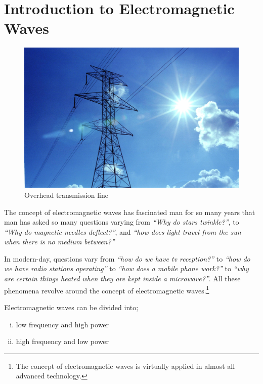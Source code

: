 \chapter{Introduction to Electromagnetic Waves}\label{lec:lec1}

\begin{figure}[h]
\centering
\includegraphics[width=1\linewidth]{./graphics/transmission1}
\caption{Overhead transmission line}
\end{figure}

The concept of electromagnetic waves has fascinated man for so many years that man has asked so many questions varying from \emph{\textquotedblleft Why do stars twinkle?\textquotedblright}, to \emph{\textquotedblleft Why do magnetic needles deflect?\textquotedblright}, and \emph{\textquotedblleft how does light travel from the sun when there is no medium between?\textquotedblright}

In modern-day, questions vary from \emph{\textquotedblleft how do we have tv reception?\textquotedblright} to \emph{\textquotedblleft how do we have radio stations operating\textquotedblright} to \emph{\textquotedblleft how does a mobile phone work?\textquotedblright} to \emph{\textquotedblleft why are certain things heated when they are kept inside a microwave?\textquotedblright}. All these phenomena revolve around the concept of electromagnetic waves.\footnote{The concept of electromagnetic waves is virtually applied in almost all advanced technology.}

Electromagnetic waves can be divided into;
\begin{enumerate}[(i)]
\item low frequency and high power
\item high frequency and low power
\end{enumerate}

